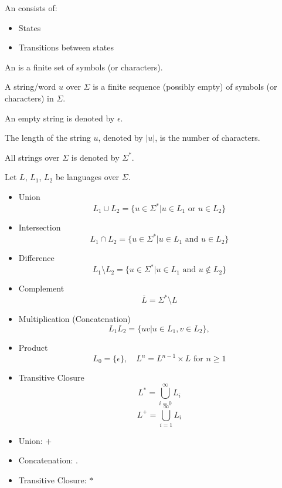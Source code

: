   \par An  consists of:
    \begin{itemize}
      \item States
      \item Transitions between states
    \end{itemize}

    \par An  is a finite set of symbols (or characters).
    \par A string/word $u$ over $\Sigma$ is a finite sequence (possibly empty) of symbols (or characters) in $\Sigma$.
    \par An empty string is denoted by $\epsilon$.
    \par The length of the string $u$, denoted by $|u|$, is the number of characters.
    \par All strings over $\Sigma$ is denoted by $\Sigma^*$.

  \par Let $L$, $L_1$, $L_2$ be languages over $\Sigma$.
  \begin{itemize}
    \item Union
    \[
      L_1 \cup L_2 = \{ u \in \Sigma^* | u \in L_1 \text{ or } u \in L_2 \}
    \]
    \item Intersection
    \[
      L_1 \cap L_2 = \{ u \in \Sigma^* | u \in L_1 \text{ and } u \in L_2 \}
    \]
    \item Difference
    \[
      L_1 \setminus L_2 = \{ u \in \Sigma^* | u \in L_1 \text{ and } u \not \in L_2 \}
    \]
    \item Complement
    \[
      \bar{L} = \Sigma^* \setminus L
    \]
    \item Multiplication (Concatenation)
    \[
      L_1 L_2 = \{uv | u \in L_1, v \in L_2\},
    \]
    \item Product
    \[
      L_0 = \{\epsilon\}, \quad L^n = L^{n - 1} \times L \text{ for } n \geq 1
    \]
    \item Transitive Closure
    \[
      L^* = \bigcup\limits_{i = 0}^{\infty} L_i
    \]
    \[
      L^+ = \bigcup\limits_{i = 1}^{\infty} L_i
    \]
  \end{itemize}

    \begin{itemize}
      \item Union: $+$
      \item Concatenation: $.$
      \item Transitive Closure: $*$
    \end{itemize}

